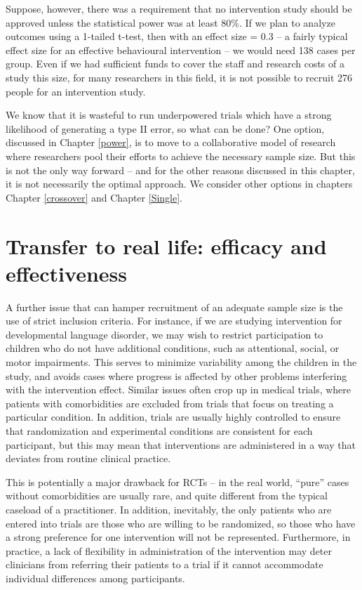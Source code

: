 \documentclass{krantz}
\begin{document}
Suppose, however, there was a requirement that no intervention study should be approved unless the statistical power was at least 80\%. If we plan to analyze outcomes using a 1-tailed t-test, then with an effect size = 0.3 -- a fairly typical effect size for an effective behavioural intervention -- we would need 138 cases per group. Even if we had sufficient funds to cover the staff and research costs of a study this size, for many researchers in this field, it is not possible to recruit 276 people for an intervention study.

We know that it is wasteful to run underpowered trials which have a strong likelihood of generating a type II error, so what can be done? One option, discussed in Chapter \ref{power}, is to move to a collaborative model of research where researchers pool their efforts to achieve the necessary sample size. But this is not the only way forward -- and for the other reasons discussed in this chapter, it is not necessarily the optimal approach. We consider other options in chapters Chapter \ref{crossover} and Chapter \ref{Single}.

\hypertarget{transfer-to-real-life-efficacy-and-effectiveness}{%
\section{Transfer to real life: efficacy and effectiveness}\label{transfer-to-real-life-efficacy-and-effectiveness}}

A further issue that can hamper recruitment of an adequate sample size is the use of strict inclusion criteria. For instance, if we are studying intervention for developmental language disorder, we may wish to restrict participation to children who do not have additional conditions, such as attentional, social, or motor impairments. This serves to minimize variability among the children in the study, and avoids cases where progress is affected by other problems interfering with the intervention effect. Similar issues often crop up in medical trials, where patients with comorbidities are excluded from trials that focus on treating a particular condition. In addition, trials are usually highly controlled to ensure that randomization and experimental conditions are consistent for each participant, but this may mean that interventions are administered in a way that deviates from routine clinical practice.

This is potentially a major drawback for RCTs -- in the real world, ``pure'' cases without comorbidities are usually rare, and quite different from the typical caseload of a practitioner. In addition, inevitably, the only patients who are entered into trials are those who are willing to be randomized, so those who have a strong preference for one intervention will not be represented. Furthermore, in practice, a lack of flexibility in administration of the intervention may deter clinicians from referring their patients to a trial if it cannot accommodate individual differences among participants.
\end{document}
